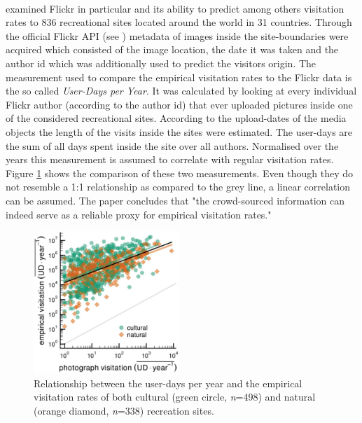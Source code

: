 \paragraph*{\textcite{Wood2013}} examined Flickr in particular and its ability to predict among others visitation rates to 836 recreational sites located around the world in 31 countries. Through the official Flickr API (see ) metadata of images inside the site-boundaries were acquired which consisted of the image location, the date it was taken and the author id which was additionally used to predict the visitors origin. The measurement used to compare the empirical visitation rates to the Flickr data is the so called \textit{User-Days per Year}. It was calculated by looking at every individual Flickr author (according to the author id) that ever uploaded pictures inside one of the considered recreational sites. According to the upload-dates of the media objects the length of the visits inside the sites were estimated. The user-days are the sum of all days spent inside the site over all authors. Normalised over the years this measurement is assumed to correlate with regular visitation rates. \\
Figure \ref{fig:wood_user_days} shows the comparison of these two measurements. Even though they do not resemble a 1:1 relationship as compared to the grey line, a linear correlation can be assumed. The paper concludes that "the crowd-sourced information can indeed serve as a reliable proxy for empirical visitation rates."

\begin{figure}[h]
   \begin{center}
   \includegraphics[width=0.49\textwidth]{img/wood_user_photodays.pdf}
   \end{center}
   \caption{Relationship between the user-days per year and the empirical visitation rates of both cultural (green circle, \textit{n}=498) and natural (orange diamond, \textit{n}=338) recreation sites.}
   \label{fig:wood_user_days}
\end{figure}

